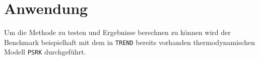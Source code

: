 \documentclass[../thesis.tex]{subfiles}
\begin{document}
\chapter{Anwendung}

Um die Methode zu testen und Ergebnisse berechnen zu können wird der Benchmark beispielhaft mit dem in \texttt{TREND} bereits vorhanden thermodynamischen Modell \texttt{PSRK} durchgeführt.  
\end{document}

